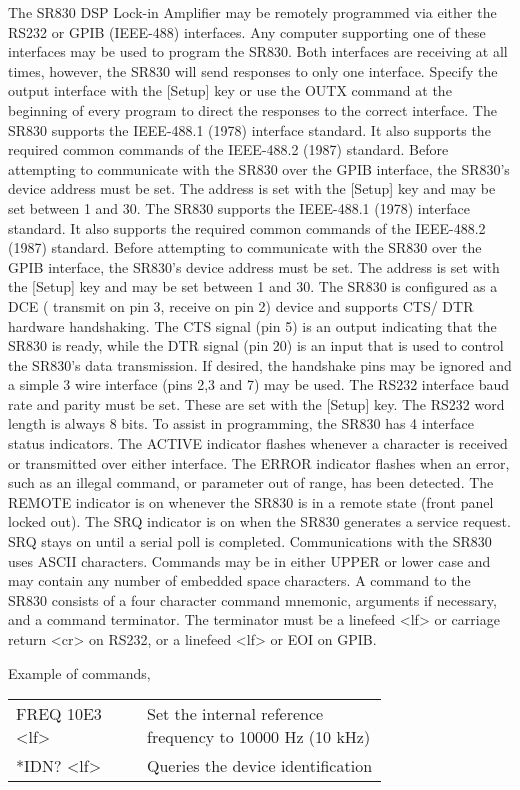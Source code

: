 The SR830 DSP Lock-in Amplifier may be remotely programmed via either the RS232 or GPIB (IEEE-488) interfaces. Any computer supporting one of these interfaces may be used to program the SR830. Both interfaces are receiving at all times, however, the SR830 will send responses to only one interface. Specify the output interface with the [Setup] key or use the OUTX command at the beginning of every program to direct the responses to the correct interface. The SR830 supports the IEEE-488.1 (1978) interface standard. It also supports the required common commands of the IEEE-488.2 (1987) standard. Before attempting to communicate with the SR830 over the GPIB interface, the SR830's device address must be set. The address is set with the [Setup] key and may be set between 1 and 30. The SR830 supports the IEEE-488.1 (1978) interface standard. It also supports the required common commands of the IEEE-488.2 (1987) standard. Before attempting to communicate with the SR830 over the GPIB interface, the SR830's device address must be set. The address is set with the [Setup] key and may be set between 1 and 30. The SR830 is configured as a DCE ( transmit on pin 3, receive on pin 2) device and supports CTS/
DTR hardware handshaking. The CTS signal (pin 5) is an output indicating that the SR830 is ready, while the DTR signal (pin 20) is an input that is used to control the SR830's data transmission. If desired, the handshake pins may be ignored and a simple 3 wire interface (pins 2,3 and 7) may be used. The RS232 interface baud rate and parity must be set. These are set with the [Setup] key. The RS232 word length is always 8 bits. To assist in programming, the SR830 has 4 interface status indicators. The ACTIVE indicator flashes whenever a character is received or transmitted over either interface. The ERROR indicator flashes when an error, such as an illegal command, or parameter out of range, has been detected. The REMOTE indicator is on whenever the SR830 is in a remote state (front panel locked out). The SRQ indicator is on when the SR830 generates a service request. SRQ stays on until a serial poll is completed. Communications with the SR830 uses ASCII characters. Commands may be in either UPPER or lower case and may contain any number of embedded space characters. A command to the SR830 consists of a four character command mnemonic, arguments if necessary, and a command terminator. The terminator must be a linefeed <lf> or carriage return <cr> on RS232, or a linefeed <lf> or EOI on GPIB.


Example of commands,

\begin{tabular}{p{0.26\linewidth} p{0.48\linewidth}}
 FREQ 10E3 <lf> & Set the internal reference frequency to 10000 Hz (10 kHz)\\
 *IDN? <lf> & Queries the device identification  
\end{tabular}
